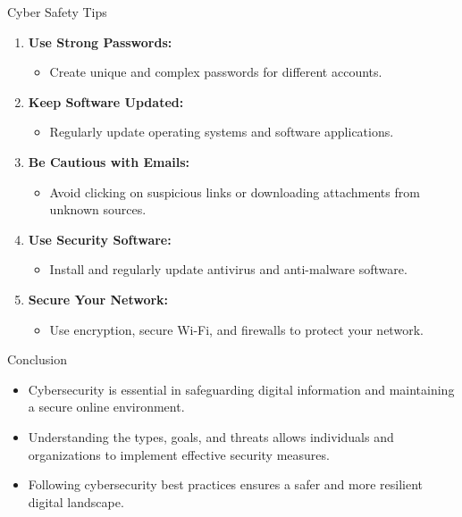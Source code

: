 \begin{frame}{Cyber Safety Tips}
  \begin{enumerate}
    \item \textbf{Use Strong Passwords:}
      \begin{itemize}
        \item Create unique and complex passwords for different accounts.
      \end{itemize}
    \item \textbf{Keep Software Updated:}
      \begin{itemize}
        \item Regularly update operating systems and software applications.
      \end{itemize}
    \item \textbf{Be Cautious with Emails:}
      \begin{itemize}
        \item Avoid clicking on suspicious links or downloading attachments from unknown sources.
      \end{itemize}
    \item \textbf{Use Security Software:}
      \begin{itemize}
        \item Install and regularly update antivirus and anti-malware software.
      \end{itemize}
    \item \textbf{Secure Your Network:}
      \begin{itemize}
        \item Use encryption, secure Wi-Fi, and firewalls to protect your network.
      \end{itemize}
  \end{enumerate}
\end{frame}

\begin{frame}{Conclusion}
  \begin{itemize}
    \item Cybersecurity is essential in safeguarding digital information and maintaining a secure online environment.
    \item Understanding the types, goals, and threats allows individuals and organizations to implement effective security measures.
    \item Following cybersecurity best practices ensures a safer and more resilient digital landscape.
  \end{itemize}
\end{frame}
